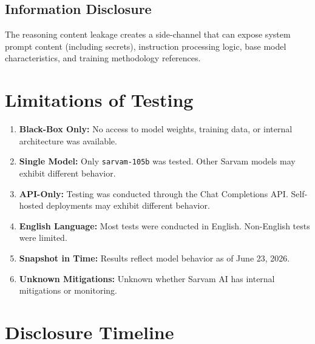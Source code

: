 \documentclass[11pt,a4paper]{article}
\begin{document}
\subsection{Information Disclosure}

The reasoning content leakage creates a side-channel that can expose system prompt content (including secrets), instruction processing logic, base model characteristics, and training methodology references.

\section{Limitations of Testing}

\begin{enumerate}[leftmargin=*]
    \item \textbf{Black-Box Only:} No access to model weights, training data, or internal architecture was available.
    \item \textbf{Single Model:} Only \texttt{sarvam-105b} was tested. Other Sarvam models may exhibit different behavior.
    \item \textbf{API-Only:} Testing was conducted through the Chat Completions API. Self-hosted deployments may exhibit different behavior.
    \item \textbf{English Language:} Most tests were conducted in English. Non-English tests were limited.
    \item \textbf{Snapshot in Time:} Results reflect model behavior as of June 23, 2026.
    \item \textbf{Unknown Mitigations:} Unknown whether Sarvam AI has internal mitigations or monitoring.
\end{enumerate}

\section{Disclosure Timeline}
\end{document}
